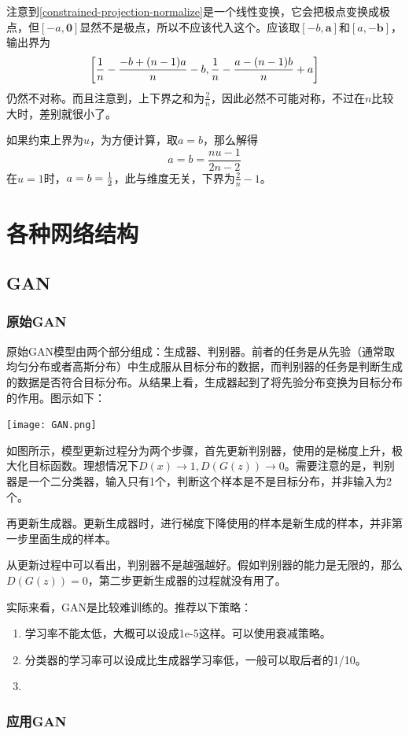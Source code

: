 注意到\ref{constrained-projection-normalize}是一个线性变换，它会把极点变换成极点，但$[-a,\bm{0}]$显然不是极点，所以不应该代入这个。应该取$[-b,\bm{a}]$和$[a,-\bm{b}]$，输出界为
$$\left[\frac{1}{n}-\frac{-b+(n-1)a}{n}-b,\frac{1}{n}-\frac{a-(n-1)b}{n}+a\right]$$
仍然不对称。而且注意到，上下界之和为$\frac{2}{n}$，因此必然不可能对称，不过在$n$比较大时，差别就很小了。

如果约束上界为$u$，为方便计算，取$a=b$，那么解得
$$a=b=\frac{nu-1}{2n-2}$$
在$u=1$时，$a=b=\frac{1}{2}$，此与维度无关，下界为$\frac{2}{n}-1$。
\section{各种网络结构}
\subsection{GAN}
\subsubsection{原始GAN}
原始GAN模型\cite{goodfellow2014generative}由两个部分组成：生成器、判别器。前者的任务是从先验（通常取均匀分布或者高斯分布）中生成服从目标分布的数据，而判别器的任务是判断生成的数据是否符合目标分布。从结果上看，生成器起到了将先验分布变换为目标分布的作用。图示如下：

\begin{center}
	\texttt{[image: GAN.png]}
\end{center}

如图所示，模型更新过程分为两个步骤，首先更新判别器，使用的是梯度上升，极大化目标函数。理想情况下$D(x)\rightarrow 1,D(G(z))\rightarrow 0$。需要注意的是，判别器是一个二分类器，输入只有1个，判断这个样本是不是目标分布，并非输入为2个。


再更新生成器。更新生成器时，进行梯度下降使用的样本是新生成的样本，并非第一步里面生成的样本。

从更新过程中可以看出，判别器不是越强越好。假如判别器的能力是无限的，那么$D(G(z))=0$，第二步更新生成器的过程就没有用了。

实际来看，GAN是比较难训练的。推荐以下策略：
\begin{enumerate}
\item 学习率不能太低，大概可以设成1e-5这样。可以使用衰减策略。
\item 分类器的学习率可以设成比生成器学习率低，一般可以取后者的1/10。
\item 
\end{enumerate}

\subsubsection{应用GAN}
